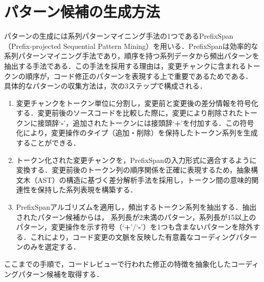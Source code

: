 \documentclass[11pt]{jreport}
\begin{document}
\section{パターン候補の生成方法}\label{generate}
パターンの生成には系列パターンマイニング手法の1つであるPrefixSpan（Prefix-projected Sequential Pattern Mining）\cite{prefixspan}を用いる．PrefixSpanは効率的な系列パターンマイニング手法であり，順序を持つ系列データから頻出パターンを抽出する手法である．この手法を採用する理由は，変更チャンクに含まれるトークンの順序が，コード修正のパターンを表現する上で重要であるためである．
具体的なパターンの収集方法は，次の3ステップで構成される．
\begin{enumerate}
    \item 変更チャンクをトークン単位に分割し，変更前と変更後の差分情報を符号化する．変更前後のソースコードを比較した際に，変更により削除されたトークンに接頭辞`\textbf{-}'，追加されたトークンには接頭辞`\textbf{+}'を付加する．この符号化により，変更操作のタイプ（追加・削除）を保持したトークン系列を生成することができる．
    \item トークン化された変更チャンクを，PrefixSpanの入力形式に適合するように変換する．変更前後のトークン列の順序関係を正確に表現するため，抽象構文木（AST）の構造に基づく差分解析手法を採用し，トークン間の意味的関連性を保持した系列表現を構築する．
    \item PrefixSpanアルゴリズムを適用し，頻出するトークン系列を抽出する．抽出されたパターン候補からは， 系列長が2未満のパターン，系列長が15以上のパターン，変更操作を示す符号（`\textbf{+}'/`\textbf{-}'）を1つも含まないパターンを除外する．これにより，コード変更の文脈を反映した有意義なコーディングパターンのみを選定する．
\end{enumerate}
ここまでの手順で，コードレビューで行われた修正の特徴を抽象化したコーディングパターン候補を取得する．
\end{document}
